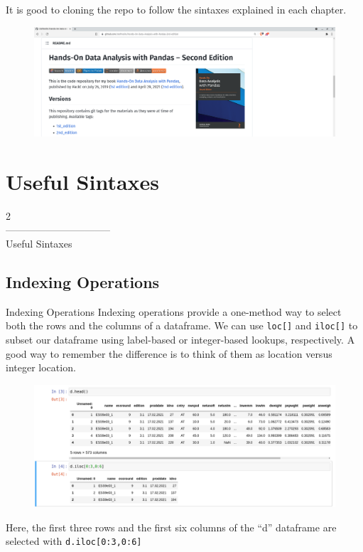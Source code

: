 \documentclass[aspectratio=169]{beamer}
\begin{document}
\begin{frame}
It is good to cloning the repo to follow the sintaxes explained in each chapter.
\begin{figure}
\centering
\includegraphics[width=.85\textwidth]{github1.png}
\end{figure}
\end{frame}

\section{Useful Sintaxes}
\begin{frame}
\begin{center}
\Huge
\textcolor{azulcesaclaro}{2\\
--------------------------------\\
Useful Sintaxes}
\end{center}
\end{frame}

\subsection{Indexing Operations}
\begin{frame}{Indexing Operations}
Indexing operations provide a one-method way to select both the rows and the columns of a dataframe. We can use \texttt{loc[]} and \texttt{iloc[]} to subset our dataframe using label-based or integer-based lookups, respectively. A good way to remember the difference is to think of them as location versus integer location.
\end{frame}

\begin{frame}
\begin{figure}
\includegraphics[width=.75\textwidth]{selecting.png}
\end{figure}
Here, the first three rows and the first six columns of the ``d'' dataframe are selected with \texttt{d.iloc[0:3,0:6]}
\end{frame}
\end{document}

